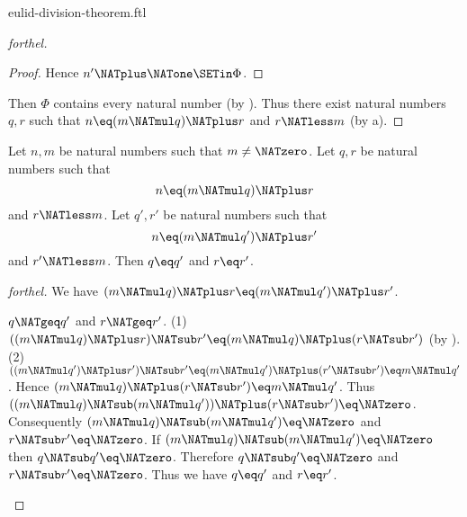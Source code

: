 \documentclass{stex}
\begin{document}
\begin{smodule}{eulid-division-theorem.ftl}
\begin{proof}[forthel]
\begin{proof}
    Hence $n' \NATplus \NATone \SETin \Phi$.
  \end{proof}

  Then $\Phi$ contains every natural number (by ).
  Thus there exist natural numbers $q, r$ such that $n \eq (m \NATmul q) \NATplus r$ and $r \NATless m$ (by a).
\end{proof}

\begin{theorem}[forthel,title=Euclid's Division Theorem: Uniqueness,id=euclid_uniqueness]
  Let $n, m$ be natural numbers such that $m \neq \NATzero$.
  Let $q, r$ be natural numbers such that
  \[n \eq (m \NATmul q) \NATplus r\]
  and $r \NATless m$.
  Let $q', r'$ be natural numbers such that
  \[n \eq (m \NATmul q') \NATplus r'\]
  and $r' \NATless m$.
  Then $q \eq q'$ and $r \eq r'$.
\end{theorem}
\begin{proof}[forthel]
  We have $(m \NATmul q) \NATplus r \eq (m \NATmul q') \NATplus r'$.

  \begin{case}{$q \NATgeq q'$ and $r \NATgeq r'$.}
    (1) $((m \NATmul q) \NATplus r) \NATsub r' \eq (m \NATmul q) \NATplus (r \NATsub r')$ (by ).
    (2) $((m \NATmul q') \NATplus r') \NATsub r'
      \eq (m \NATmul q') \NATplus (r' \NATsub r')
      \eq m \NATmul q'$.
    Hence $(m \NATmul q) \NATplus (r \NATsub r') \eq m \NATmul q'$.
    Thus $((m \NATmul q) \NATsub (m \NATmul q')) \NATplus (r \NATsub r') \eq \NATzero$.
    Consequently $(m \NATmul q) \NATsub (m \NATmul q') \eq \NATzero$ and $r \NATsub r' \eq \NATzero$.
    If $(m \NATmul q) \NATsub (m \NATmul q') \eq \NATzero$ then $q \NATsub q' \eq \NATzero$.
    Therefore $q \NATsub q' \eq \NATzero$ and $r \NATsub r' \eq \NATzero$.
    Thus we have $q \eq q'$ and $r \eq r'$.
  \end{case}


\end{proof}
\end{smodule}
\end{document}
